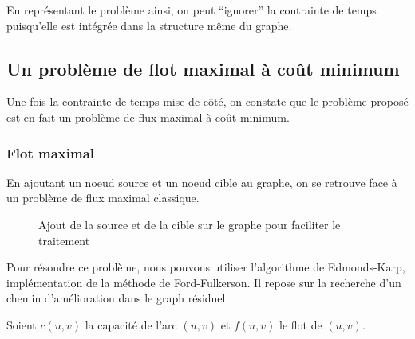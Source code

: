 \documentclass[a4paper,12pt]{article}
\begin{document}
En représentant le problème ainsi, on peut ``ignorer'' la contrainte de temps puisqu'elle est intégrée dans la structure même du graphe.


\subsection{Un problème de flot maximal à coût minimum}

Une fois la contrainte de temps mise de côté, on constate que le problème proposé est en fait un problème de flux maximal à coût minimum.

\subsubsection{Flot maximal}

En ajoutant un noeud source et un noeud cible au graphe, on se retrouve face à un problème de flux maximal classique.

\begin{figure}[H]
    \begin{center}
    \end{center}
    \caption{Ajout de la source et de la cible sur le graphe pour faciliter le traitement}
\end{figure}

Pour résoudre ce problème, nous pouvons utiliser l'algorithme de Edmonds-Karp, implémentation de la méthode de Ford-Fulkerson. Il repose sur la recherche d'un chemin d'amélioration dans le graph résiduel.

Soient $c(u,v)$ la capacité de l'arc $(u,v)$ et $f(u,v)$ le flot de $(u,v)$.
\end{document}
